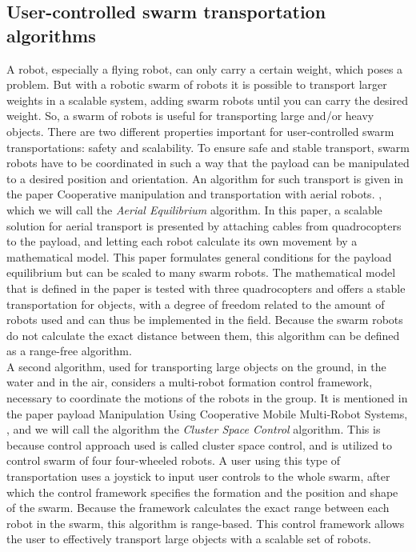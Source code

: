 \subsection{User-controlled swarm transportation algorithms}
A robot, especially a flying robot, can only carry a certain weight, which poses a problem. 
But with a robotic swarm of robots it is possible to transport larger weights in a scalable system, adding swarm robots until you can carry the desired weight. 
So, a swarm of robots is useful for transporting large and/or heavy objects. 
There are two different properties important for user-controlled swarm transportations: safety and scalability. 
To ensure safe and stable transport, swarm robots have to be coordinated in such a way that the payload can be manipulated to a desired position and orientation.
An algorithm for such transport is given in the paper Cooperative manipulation and transportation with aerial robots. \cite{Michael2011cooperative}, which we will call the \emph{Aerial Equilibrium} algorithm. 
In this paper, a scalable solution for aerial transport is presented by attaching cables from quadrocopters to the payload, and letting each robot calculate its own movement by a mathematical model. 
This paper formulates general conditions for the payload equilibrium but can be scaled to many swarm robots. 
The mathematical model that is defined in the paper is tested with three quadrocopters and offers a stable transportation for objects, with a degree of freedom related to the amount of robots used and can thus be implemented in the field.
Because the swarm robots do not calculate the exact distance between them, this algorithm can be defined as a range-free algorithm. \\

A second algorithm, used for transporting large objects on the ground, in the water and in the air, considers a multi-robot formation control framework, necessary to coordinate the motions of the robots in the group. 
It is mentioned in the paper payload Manipulation Using Cooperative Mobile Multi-Robot Systems, \cite{Mas2012object}, and we will call the algorithm the \emph{Cluster Space Control} algorithm.
This is because control approach used is called cluster space control, and is utilized to control swarm of four four-wheeled robots. 
A user using this type of transportation uses a joystick to input user controls to the whole swarm, after which the control framework specifies the formation and the position and shape of the swarm.
Because the framework calculates the exact range between each robot in the swarm, this algorithm is range-based. 
This control framework allows the user to effectively transport large objects with a scalable set of robots. \\

